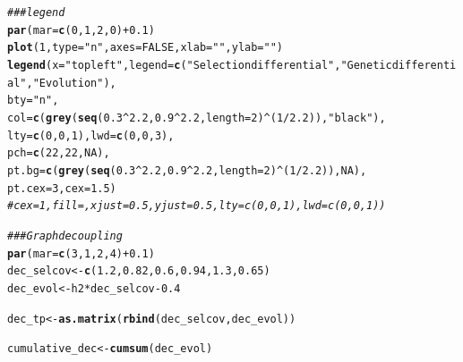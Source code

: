 \documentclass{article}\usepackage[]{graphicx}\usepackage[]{color}
\makeatletter
\newcommand{\hlnum}[1]{\textcolor[rgb]{0.686,0.059,0.569}{#1}}%
\newcommand{\hlstr}[1]{\textcolor[rgb]{0.192,0.494,0.8}{#1}}%
\newcommand{\hlcom}[1]{\textcolor[rgb]{0.678,0.584,0.686}{\textit{#1}}}%
\newcommand{\hlopt}[1]{\textcolor[rgb]{0,0,0}{#1}}%
\newcommand{\hlstd}[1]{\textcolor[rgb]{0.345,0.345,0.345}{#1}}%
\newcommand{\hlkwb}[1]{\textcolor[rgb]{0.69,0.353,0.396}{#1}}%
\newcommand{\hlkwc}[1]{\textcolor[rgb]{0.333,0.667,0.333}{#1}}%
\newcommand{\hlkwd}[1]{\textcolor[rgb]{0.737,0.353,0.396}{\textbf{#1}}}%
\newenvironment{kframe}{%
 \def\at@end@of@kframe{}%
 \ifinner\ifhmode%
  \def\at@end@of@kframe{\end{minipage}}%
  \begin{minipage}{\columnwidth}%
 \fi\fi%
 \def\FrameCommand##1{\hskip\@totalleftmargin \hskip-\fboxsep
 \colorbox{shadecolor}{##1}\hskip-\fboxsep
     \hskip-\linewidth \hskip-\@totalleftmargin \hskip\columnwidth}%
 \MakeFramed {\advance\hsize-\width
   \@totalleftmargin\z@ \linewidth\hsize
   \@setminipage}}%
 {\par\unskip\endMakeFramed%
 \at@end@of@kframe}
\newenvironment{knitrout}{}{} %
\makeatother
\begin{document}
\begin{knitrout}
\begin{kframe}
\begin{alltt}
\hlcom{### legend}
\hlkwd{par}\hlstd{(}\hlkwc{mar}\hlstd{=}\hlkwd{c}\hlstd{(}\hlnum{0}\hlstd{,} \hlnum{1}\hlstd{,} \hlnum{2}\hlstd{,}\hlnum{0}\hlstd{)} \hlopt{+} \hlnum{0.1}\hlstd{)}
\hlkwd{plot}\hlstd{(}\hlnum{1}\hlstd{,} \hlkwc{type}\hlstd{=}\hlstr{"n"}\hlstd{,} \hlkwc{axes} \hlstd{=} \hlnum{FALSE}\hlstd{,} \hlkwc{xlab}\hlstd{=}\hlstr{""}\hlstd{,} \hlkwc{ylab}\hlstd{=}\hlstr{""}\hlstd{)}
\hlkwd{legend}\hlstd{(}\hlkwc{x} \hlstd{=} \hlstr{"topleft"}\hlstd{,} \hlkwc{legend} \hlstd{=} \hlkwd{c}\hlstd{(}\hlstr{"Selection differential"}\hlstd{,} \hlstr{"Genetic differential"}\hlstd{,} \hlstr{"Evolution"}\hlstd{),}
              \hlkwc{bty} \hlstd{=} \hlstr{"n"}\hlstd{,}
       \hlkwc{col} \hlstd{=} \hlkwd{c}\hlstd{(}\hlkwd{grey}\hlstd{(}\hlkwd{seq}\hlstd{(}\hlnum{0.3}\hlopt{^}\hlnum{2.2}\hlstd{,} \hlnum{0.9}\hlopt{^}\hlnum{2.2}\hlstd{,} \hlkwc{length} \hlstd{=} \hlnum{2}\hlstd{)}\hlopt{^}\hlstd{(}\hlnum{1}\hlopt{/}\hlnum{2.2}\hlstd{)),}\hlstr{"black"}\hlstd{),}
       \hlkwc{lty} \hlstd{=} \hlkwd{c}\hlstd{(}\hlnum{0}\hlstd{,} \hlnum{0}\hlstd{,} \hlnum{1}\hlstd{),} \hlkwc{lwd} \hlstd{=} \hlkwd{c}\hlstd{(}\hlnum{0}\hlstd{,} \hlnum{0}\hlstd{,} \hlnum{3}\hlstd{),}
       \hlkwc{pch} \hlstd{=} \hlkwd{c}\hlstd{(}\hlnum{22}\hlstd{,} \hlnum{22}\hlstd{,} \hlnum{NA}\hlstd{),}
       \hlkwc{pt.bg} \hlstd{=} \hlkwd{c}\hlstd{(}\hlkwd{grey}\hlstd{(}\hlkwd{seq}\hlstd{(}\hlnum{0.3}\hlopt{^}\hlnum{2.2}\hlstd{,} \hlnum{0.9}\hlopt{^}\hlnum{2.2}\hlstd{,} \hlkwc{length} \hlstd{=} \hlnum{2}\hlstd{)}\hlopt{^}\hlstd{(}\hlnum{1}\hlopt{/}\hlnum{2.2}\hlstd{)),}\hlnum{NA}\hlstd{),}
       \hlkwc{pt.cex} \hlstd{=} \hlnum{3}\hlstd{,} \hlkwc{cex}\hlstd{=}\hlnum{1.5}\hlstd{)}
\hlcom{#cex=1, fill = , xjust=0.5, yjust=0.5, lty=c(0,0,1), lwd = c(0, 0, 1))}

\hlcom{### Graph decoupling }
\hlkwd{par}\hlstd{(}\hlkwc{mar}\hlstd{=}\hlkwd{c}\hlstd{(}\hlnum{3}\hlstd{,} \hlnum{1}\hlstd{,} \hlnum{2}\hlstd{,} \hlnum{4}\hlstd{)} \hlopt{+} \hlnum{0.1}\hlstd{)}
\hlstd{dec_selcov} \hlkwb{<-} \hlkwd{c}\hlstd{(}\hlnum{1.2}\hlstd{,}\hlnum{0.82}\hlstd{,}\hlnum{0.6}\hlstd{,}\hlnum{0.94}\hlstd{,}\hlnum{1.3}\hlstd{,}\hlnum{0.65}\hlstd{)}
\hlstd{dec_evol} \hlkwb{<-} \hlstd{h2}\hlopt{*} \hlstd{dec_selcov} \hlopt{-} \hlnum{0.4}

\hlstd{dec_tp} \hlkwb{<-} \hlkwd{as.matrix}\hlstd{(}\hlkwd{rbind}\hlstd{(dec_selcov, dec_evol))}

\hlstd{cumulative_dec} \hlkwb{<-} \hlkwd{cumsum}\hlstd{(dec_evol)}


\end{alltt}
\end{kframe}
\end{knitrout}
\end{document}
